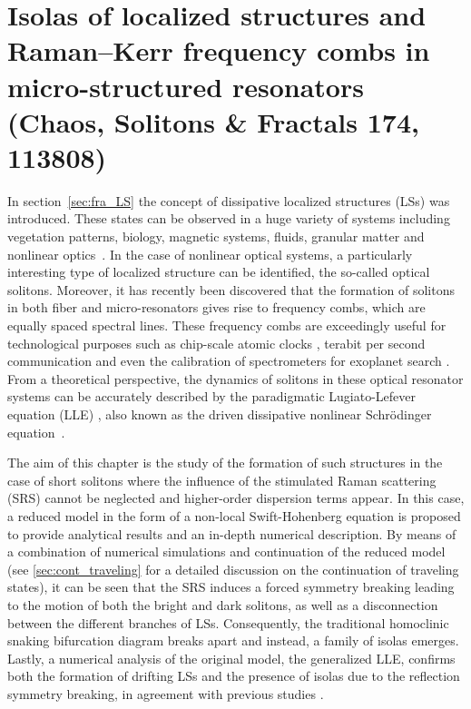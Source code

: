 \chapter{Isolas of localized structures and Raman–Kerr frequency combs in micro-structured resonators (Chaos, Solitons \& Fractals 174, 113808)}

In section~\ref{sec:fra_LS} the concept of dissipative 
localized structures (LSs) was introduced. These states can be observed in a huge variety
of systems including vegetation patterns, biology, magnetic systems, fluids,
granular matter and nonlinear 
optics~\cite{tlidi2014localized,heimburg2005soliton,descalzi2011localized,purwins2010dissipative,ankiewicz2008dissipative,knobloch2015spatial}. 
In the case of nonlinear optical systems,
a particularly interesting type of localized structure can be identified,
the so-called optical solitons. Moreover, it has recently been discovered that the formation of solitons
in both fiber and micro-resonators gives rise to frequency combs, which are equally
spaced spectral lines. These frequency combs are exceedingly useful
for technological purposes such as chip-scale atomic clocks \cite{Jost2015clock}, terabit
per second communication \cite{marin2017microresonator} and even the calibration of spectrometers
for exoplanet search \cite{suh2019searching}. From a theoretical perspective, the dynamics
of solitons in these optical resonator systems can be accurately described 
by the paradigmatic Lugiato-Lefever equation (LLE) \cite{lugiatolefever1987},
also known as the driven dissipative nonlinear Schrödinger
equation~\cite{morales1974ponderomotive,nozaki1984solitons,kaup1978theory,ferre2017localized}.

The aim of this chapter is the study of the formation of such structures in the
case of short solitons where the influence of the stimulated Raman scattering (SRS)
cannot be neglected and higher-order dispersion terms appear. In this case, a reduced model
in the form of a non-local Swift-Hohenberg equation is proposed to provide 
analytical results and an in-depth numerical description. By means of a combination of
numerical simulations and
continuation of the reduced model (see \ref{sec:cont_traveling} for a detailed discussion on the
continuation of traveling states), it can be seen that the SRS induces a forced symmetry
breaking leading to the motion of both the bright and dark solitons, as well as a disconnection between 
the different branches of LSs. Consequently, the traditional homoclinic snaking bifurcation diagram breaks
apart and instead, a family of isolas emerges. Lastly, a numerical analysis of the
original model, the generalized LLE, confirms both the formation of drifting LSs and
the presence of isolas due to the reflection symmetry breaking, in agreement with previous studies \cite{burke2009swift,parra2014third}.

